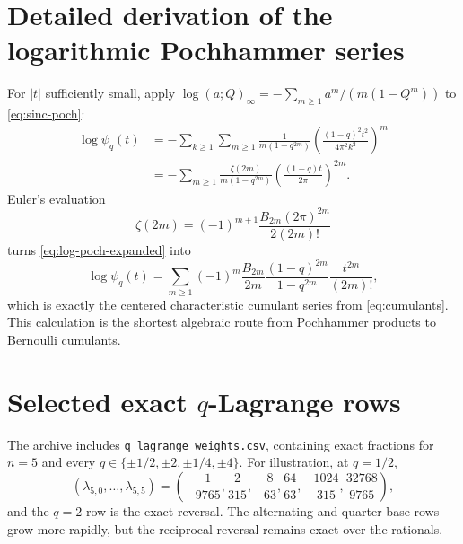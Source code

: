 \documentclass[11pt,oneside]{article}
\theoremstyle{definition}
\theoremstyle{remark}
\begin{document}
\appendix

\section{Detailed derivation of the logarithmic Pochhammer series}
For \(|t|\) sufficiently small, apply
\(\log(a;Q)_\infty=-\sum_{m\ge1}a^m/(m(1-Q^m))\) to
\eqref{eq:sinc-poch}:
\begin{align}
 \log\psi_q(t)
 &=-\sum_{k\ge1}\sum_{m\ge1}
 \frac1{m(1-q^{2m})}
 \left(\frac{(1-q)^2t^2}{4\pi^2k^2}\right)^m\\
 &=-\sum_{m\ge1}\frac{\zeta(2m)}{m(1-q^{2m})}
 \left(\frac{(1-q)t}{2\pi}\right)^{2m}.
 \label{eq:log-poch-expanded}
\end{align}
Euler's evaluation
\[
 \zeta(2m)=(-1)^{m+1}
 \frac{B_{2m}(2\pi)^{2m}}{2(2m)!}
\]
turns \eqref{eq:log-poch-expanded} into
\[
 \log\psi_q(t)
 =\sum_{m\ge1}(-1)^m
 \frac{B_{2m}}{2m}\frac{(1-q)^{2m}}{1-q^{2m}}
 \frac{t^{2m}}{(2m)!},
\]
which is exactly the centered characteristic cumulant series from
\eqref{eq:cumulants}.  This calculation is the shortest algebraic route from
Pochhammer products to Bernoulli cumulants.

\section{Selected exact \texorpdfstring{\(q\)}{q}-Lagrange rows}
The archive includes \texttt{q\_lagrange\_weights.csv}, containing exact
fractions for \(n=5\) and every \(q\in\{\pm1/2,\pm2,\pm1/4,\pm4\}\).  For
illustration, at \(q=1/2\),
\[
 (\lambda_{5,0},\ldots,\lambda_{5,5})
 =\left(
 -\frac1{9765},\frac2{315},-\frac8{63},
 \frac{64}{63},-\frac{1024}{315},\frac{32768}{9765}
 \right),
\]
and the \(q=2\) row is the exact reversal.  The alternating and quarter-base
rows grow more rapidly, but the reciprocal reversal remains exact over the
rationals.
\end{document}

